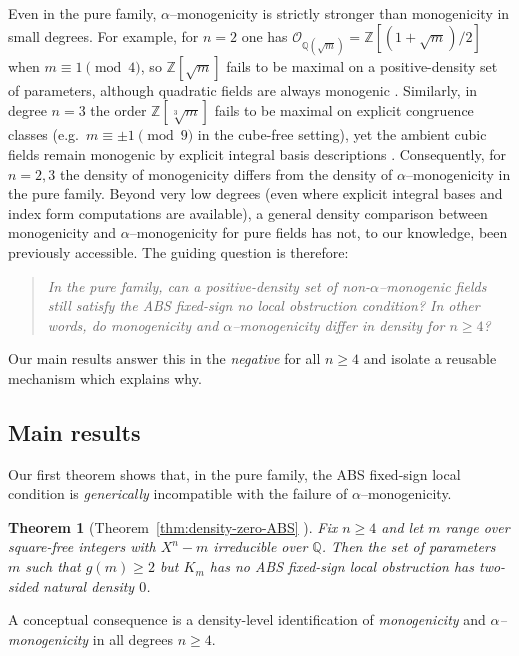 \documentclass[11pt,letterpaper]{amsart}
\newcommand{\Z}{\mathbb{Z}}
\newcommand{\Q}{\mathbb{Q}}
\newcommand{\Ocal}{\mathcal{O}}
\theoremstyle{plain}
\newtheorem{theorem}{Theorem}[section]
\theoremstyle{definition}
\theoremstyle{remark}
\theoremstyle{plain}
\begin{document}
Even in the pure family, $\alpha$--monogenicity is strictly stronger than monogenicity in small degrees. For example, for $n=2$ one has $\Ocal_{\Q(\sqrt{m})}=\Z[(1+\sqrt{m})/2]$ when $m\equiv1\pmod4$, so $\Z[\sqrt{m}]$ fails to be maximal on a positive-density set of parameters, although quadratic fields are always monogenic \cite{NeukirchANT}. Similarly, in degree $n=3$ the order $\Z[\sqrt[3]{m}]$ fails to be maximal on explicit congruence classes
(e.g.\ $m\equiv \pm1\pmod9$ in the cube-free setting), yet the ambient cubic fields remain monogenic by explicit integral basis descriptions \cite{AyginNguyen2021}. Consequently, for $n=2,3$ the density of monogenicity differs from the density of $\alpha$--monogenicity in the pure family. Beyond very low degrees (even where explicit integral bases and index form computations are available), a general density comparison between monogenicity and $\alpha$--monogenicity for pure fields has not,
to our knowledge, been previously accessible. The guiding question is therefore:

\begin{quote}
\emph{In the pure family, can a positive-density set of non-$\alpha$--monogenic fields still satisfy the ABS fixed-sign \emph{no local obstruction} condition?  In other words, do monogenicity and $\alpha$--monogenicity differ in density for $n\ge4$?}
\end{quote}

Our main results answer this in the \emph{negative} for all $n\ge4$ and isolate a reusable mechanism which explains why.

\subsection{Main results}

Our first theorem shows that, in the pure family, the ABS fixed-sign local condition is \emph{generically}
incompatible with the failure of $\alpha$--monogenicity.

\begin{theorem}[Theorem~\ref{thm:density-zero-ABS} ]
\label{thm:intro-density-zero}
Fix $n\ge4$ and let $m$ range over square-free integers with $X^n-m$ irreducible over $\Q$. Then the set of parameters $m$ such that $g(m)\ge2$ but $K_m$ has \emph{no} ABS fixed-sign local obstruction has two-sided natural density $0$.
\end{theorem}

A conceptual consequence is a density-level identification of \emph{monogenicity} and
\emph{$\alpha$--monogenicity} in all degrees $n\ge4$.
\end{document}
